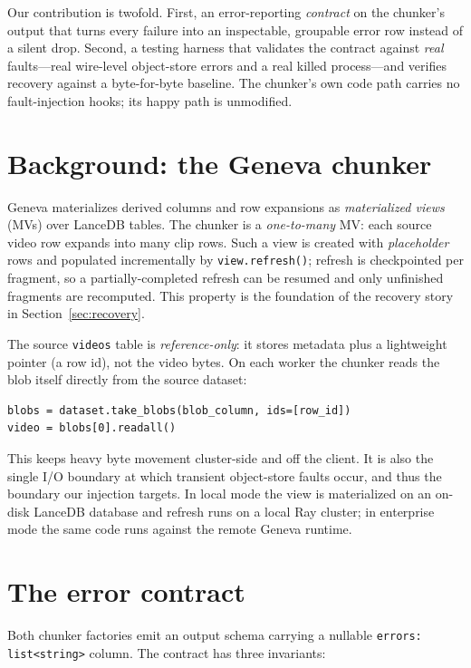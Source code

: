 \documentclass[11pt]{article}
\newcommand{\ct}[1]{\texttt{\small #1}}
\begin{document}
Our contribution is twofold. First, an error-reporting \emph{contract} on the
chunker's output that turns every failure into an inspectable, groupable error
row instead of a silent drop. Second, a testing harness that validates the
contract against \emph{real} faults---real wire-level object-store errors and a
real killed process---and verifies recovery against a byte-for-byte baseline. The
chunker's own code path carries no fault-injection hooks; its happy path is
unmodified.

\section{Background: the Geneva chunker}

Geneva materializes derived columns and row expansions as \emph{materialized
views} (MVs) over LanceDB tables. The chunker is a \emph{one-to-many} MV: each
source video row expands into many clip rows. Such a view is created with
\emph{placeholder} rows and populated incrementally by \ct{view.refresh()};
refresh is checkpointed per fragment, so a partially-completed refresh can be
resumed and only unfinished fragments are recomputed. This property is the
foundation of the recovery story in Section~\ref{sec:recovery}.

The source \ct{videos} table is \emph{reference-only}: it stores metadata plus a
lightweight pointer (a row id), not the video bytes. On each worker the chunker
reads the blob itself directly from the source dataset:

\begin{lstlisting}[style=py]
blobs = dataset.take_blobs(blob_column, ids=[row_id])
video = blobs[0].readall()
\end{lstlisting}

\noindent
This keeps heavy byte movement cluster-side and off the client. It is also the
single I/O boundary at which transient object-store faults occur, and thus the
boundary our injection targets. In local mode the view is materialized on an
on-disk LanceDB database and refresh runs on a local Ray cluster; in enterprise
mode the same code runs against the remote Geneva runtime.

\section{The error contract}

Both chunker factories emit an output schema carrying a nullable
\ct{errors: list<string>} column. The contract has three invariants:
\end{document}
